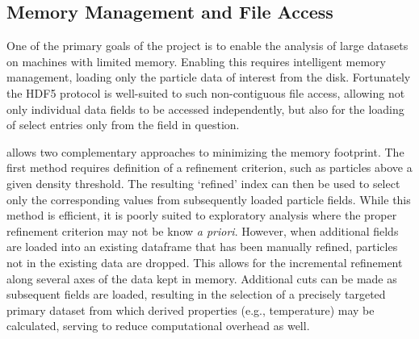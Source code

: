 \subsection{Memory Management and File Access}
\label{sec:fileIO}
One of the primary goals of the  project is to enable the analysis of large datasets on machines with limited memory.
Enabling this requires intelligent memory management, loading only the particle data of interest from the disk.
Fortunately the HDF5 protocol is well-suited to such non-contiguous file access, allowing not only individual data fields to be accessed independently, but also for the loading of select entries only from the field in question.

 allows two complementary approaches to minimizing the memory footprint.
The first method requires definition of a refinement criterion, such as particles above a given density threshold.
The resulting `refined' index can then be used to select only the corresponding values from subsequently loaded particle fields.
While this method is efficient, it is poorly suited to exploratory analysis where the proper refinement criterion may not be know {\it{a priori}}.
However, when additional fields are loaded into an existing  dataframe that has been manually refined, particles not in the existing data are dropped.
This allows for the incremental refinement along several axes of the data kept in memory.
Additional cuts can be made as subsequent fields are loaded, resulting in the selection of a precisely targeted primary dataset from which derived properties (e.g., temperature) may be calculated, serving to reduce computational overhead as well.